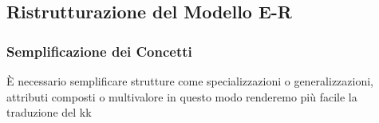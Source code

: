 \documentclass{article}
\begin{document}

%

\subsection{Ristrutturazione del Modello E-R}
\subsubsection{Semplificazione dei Concetti}

È necessario semplificare strutture come specializzazioni o generalizzazioni, attributi composti o multivalore in questo modo renderemo più facile la traduzione del kk
\end{document}
